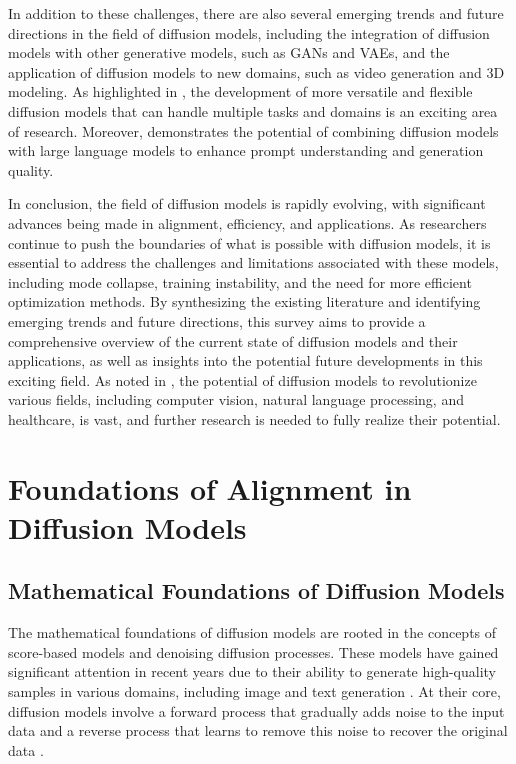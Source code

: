 \documentclass[11pt,a4paper]{article}
\begin{document}
In addition to these challenges, there are also several emerging trends and future directions in the field of diffusion models, including the integration of diffusion models with other generative models, such as GANs and VAEs, and the application of diffusion models to new domains, such as video generation and 3D modeling. As highlighted in \cite{doi:10.1109/iccv51070.2023.00713}, the development of more versatile and flexible diffusion models that can handle multiple tasks and domains is an exciting area of research. Moreover, \cite{arxiv:2305.13655} demonstrates the potential of combining diffusion models with large language models to enhance prompt understanding and generation quality.

In conclusion, the field of diffusion models is rapidly evolving, with significant advances being made in alignment, efficiency, and applications. As researchers continue to push the boundaries of what is possible with diffusion models, it is essential to address the challenges and limitations associated with these models, including mode collapse, training instability, and the need for more efficient optimization methods. By synthesizing the existing literature and identifying emerging trends and future directions, this survey aims to provide a comprehensive overview of the current state of diffusion models and their applications, as well as insights into the potential future developments in this exciting field. As noted in \cite{doi:10.1109/tpami.2025.3545047}, the potential of diffusion models to revolutionize various fields, including computer vision, natural language processing, and healthcare, is vast, and further research is needed to fully realize their potential.


\section{Foundations of Alignment in Diffusion Models}



\subsection{Mathematical Foundations of Diffusion Models}


The mathematical foundations of diffusion models are rooted in the concepts of score-based models and denoising diffusion processes. These models have gained significant attention in recent years due to their ability to generate high-quality samples in various domains, including image and text generation \cite{doi:10.1109/tpami.2023.3261988}. At their core, diffusion models involve a forward process that gradually adds noise to the input data and a reverse process that learns to remove this noise to recover the original data \cite{doi:10.1145/3626235}. 
\end{document}
